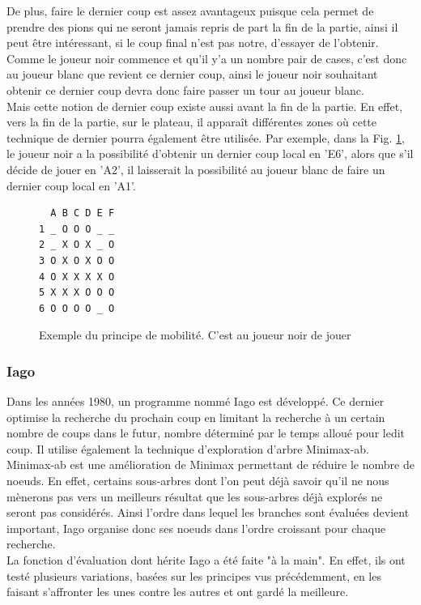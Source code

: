 \documentclass[10pt,a4paper]{article}
\begin{document}
\begin{itemize}
De plus, faire le dernier coup est assez avantageux puisque cela permet de prendre des pions qui ne seront jamais repris de part la fin de la partie, ainsi il peut être intéressant, si le coup final n'est pas notre, d'essayer de l'obtenir. Comme le joueur noir commence et qu'il y'a un nombre pair de cases, c'est donc au joueur blanc que revient ce dernier coup, ainsi le joueur noir souhaitant obtenir ce dernier coup devra donc faire passer un tour au joueur blanc.\\

Mais cette notion de dernier coup existe aussi avant la fin de la partie. En effet, vers la fin de la partie, sur le plateau, il apparaît différentes zones où cette technique de dernier pourra également être utilisée. Par exemple, dans la Fig. \ref{fig:mobilité}, le joueur noir a la possibilité d'obtenir un dernier coup local en 'E6', alors que s'il décide de jouer en 'A2', il laisserait la possibilité au joueur blanc de faire un dernier coup local en 'A1'.
\begin{figure}[H]    
\centering
\begin{BVerbatim}
  A B C D E F
1 _ O O O _ _
2 _ X O X _ O
3 O X O X O O
4 O X X X X O
5 X X X O O O
6 O O O O _ O
\end{BVerbatim}
\caption {Exemple du principe de mobilité. C'est au joueur noir de jouer\label{fig:mobilité}}
\end{figure}
\end{itemize}

\subsubsection {Iago}

Dans les années 1980, un programme nommé Iago\cite{Ros81} est développé. Ce dernier optimise la recherche du prochain coup en limitant la recherche à un certain nombre de coups dans le futur, nombre déterminé par le temps alloué pour ledit coup. Il utilise également la technique d'exploration d'arbre Minimax-ab. Minimax-ab est une amélioration de Minimax permettant de réduire le nombre de noeuds. En effet, certains sous-arbres dont l'on peut déjà savoir qu'il ne nous mènerons pas vers un meilleurs résultat que les sous-arbres déjà explorés ne seront pas considérés. Ainsi l'ordre dans lequel les branches sont évaluées devient important, Iago organise donc ses noeuds dans l'ordre croissant pour chaque recherche.\\

La fonction d'évaluation dont hérite Iago a été faite "à la main". En effet, ils ont testé plusieurs variations, basées sur les principes vus précédemment, en les faisant s'affronter les unes contre les autres et ont gardé la meilleure.
\end{document}
